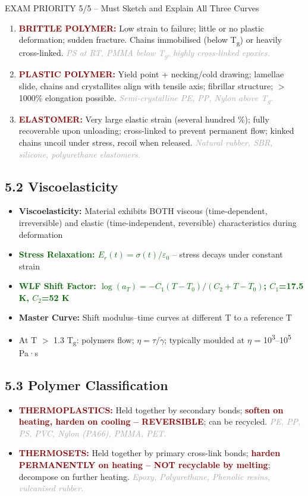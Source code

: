 \documentclass[11pt,a4paper]{article}
\newcommand{\mysubsec}[1]{\subsection*{#1}}
\newcommand{\CRIT}[1]{\textcolor{DarkRed}{\textbf{#1}}}
\newcommand{\KEY}[1]{\textcolor{SecondaryDark}{\textbf{#1}}}
\newcommand{\FML}[1]{\textcolor{DarkGreen}{\textbf{#1}}}
\newcommand{\EXA}[1]{\textcolor{DarkGray}{\textit{#1}}}
\begin{document}
\begin{critbox}{EXAM PRIORITY 5/5 -- Must Sketch and Explain All Three Curves}
\begin{enumerate}[leftmargin=*,nosep]
    \item \CRIT{BRITTLE POLYMER:} Low strain to failure; little or no plastic deformation; sudden fracture. Chains immobilised (below T\textsubscript{g}) or heavily cross-linked. \EXA{PS at RT, PMMA below T\textsubscript{g}, highly cross-linked epoxies.}
    \item \CRIT{PLASTIC POLYMER:} Yield point + necking/cold drawing; lamellae slide, chains and crystallites align with tensile axis; fibrillar structure; $>$1000\% elongation possible. \EXA{Semi-crystalline PE, PP, Nylon above T\textsubscript{g}.}
    \item \CRIT{ELASTOMER:} Very large elastic strain (several hundred \%); fully recoverable upon unloading; cross-linked to prevent permanent flow; kinked chains uncoil under stress, recoil when released. \EXA{Natural rubber, SBR, silicone, polyurethane elastomers.}
\end{enumerate}
\end{critbox}

\mysubsec{5.2 Viscoelasticity}
\begin{itemize}[leftmargin=*,nosep]
    \item \KEY{Viscoelasticity:} Material exhibits BOTH viscous (time-dependent, irreversible) and elastic (time-independent, reversible) characteristics during deformation
    \item \FML{Stress Relaxation: $E_r(t) = \sigma(t)/\varepsilon_0$} -- stress decays under constant strain
    \item \FML{WLF Shift Factor: $\log(a_T) = -C_1(T-T_0)/(C_2+T-T_0)$; $C_1$=17.5 K, $C_2$=52 K}
    \item \textbf{Master Curve:} Shift modulus--time curves at different T to a reference T
    \item At T $>$ 1.3 T\textsubscript{g}: polymers flow; $\eta = \tau/\dot{\gamma}$; typically moulded at $\eta$ = 10\textsuperscript{3}--10\textsuperscript{5} Pa·s
\end{itemize}

\mysubsec{5.3 Polymer Classification}
\begin{itemize}[leftmargin=*,nosep]
    \item \CRIT{THERMOPLASTICS:} Held together by secondary bonds; \CRIT{soften on heating, harden on cooling -- REVERSIBLE}; can be recycled. \EXA{PE, PP, PS, PVC, Nylon (PA66), PMMA, PET.}
    \item \CRIT{THERMOSETS:} Held together by primary cross-link bonds; \CRIT{harden PERMANENTLY on heating -- NOT recyclable by melting}; decompose on further heating. \EXA{Epoxy, Polyurethane, Phenolic resins, vulcanised rubber.}
\end{itemize}
\end{document}
